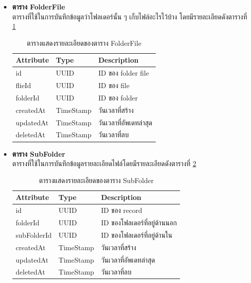 \documentclass[12pt,oneside,openright,a4paper]{cpe-thai-project}
\begin{document}
\begin{itemize}
\item \textbf{ตาราง FolderFile}\\
ตารางที่ใช้ในการบันทึกข้อมูลว่าโฟลเดอร์นั้น ๆ เก็บไฟล์อะไรไว้บ้าง โดยมีรายละเอียดดังตารางที่  \ref{tbl:dbFolderFile}
\begin{table}[!ht]
    \centering
    \begin{tabular}{|p{4cm}|p{2cm}|p{6cm}|}
    \hline
    \textbf{Attribute} & \textbf{Type} & \textbf{Description}   \\ \hline
    id        & UUID      & ID ของ folder file     \\ \hline
    flieId    & UUID      & ID ของ file            \\ \hline
    folderId  & UUID      & ID ของ folder          \\ \hline
    createdAt & TimeStamp & วันเวลาที่สร้าง        \\ \hline
    updatedAt & TimeStamp & วันเวลาที่อัพเดทล่าสุด \\ \hline
    deletedAt & TimeStamp & วันเวลาที่ลบ              \\ \hline
    \end{tabular}
    \caption{\centering  ตารางแสดงรายละเอียดของตาราง FolderFile} \label{tbl:dbFolderFile}
\end{table}
\newpage
\item \textbf{ตาราง SubFolder}\\
ตารางที่ใช้ในการบันทึกข้อมูลรายละเอียดไฟล์โดยมีรายละเอียดดังตารางที่ \ref{tbl:dbSubFolder}
\begin{table}[!ht]
    \centering
    \begin{tabular}{|p{4cm}|p{2cm}|p{6cm}|}
    \hline
    \textbf{Attribute} & \textbf{Type} & \textbf{Description}   \\ \hline
    id          & UUID      & ID ของ record                \\ \hline
    folderId    & UUID      & ID ของโฟลเดอร์ที่อยู่ด้านนอก \\ \hline
    subFolderId & UUID      & ID ของโฟลเดอร์ที่อยู่ด้านใน  \\ \hline
    createdAt   & TimeStamp & วันเวลาที่สร้าง              \\ \hline
    updatedAt   & TimeStamp & วันเวลาที่อัพเดทล่าสุด       \\ \hline
    deletedAt   & TimeStamp & วันเวลาที่ลบ                \\ \hline  
    \end{tabular}
    \caption{\centering  ตารางแสดงรายละเอียดของตาราง SubFolder} \label{tbl:dbSubFolder}
\end{table}


\end{itemize}
\end{document}
